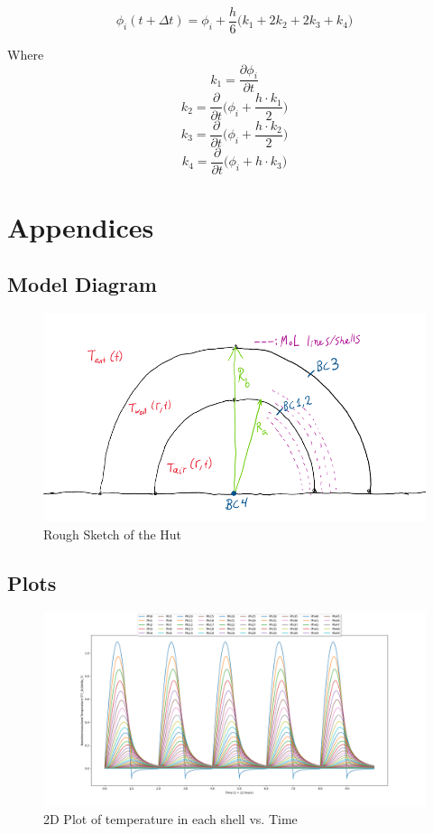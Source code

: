 \documentclass{article}
\begin{document}
\[\phi_i(t+\Delta t) = \phi_i + \frac{h}{6} \big(k_1 + 2k_2 + 2k_3 + k_4)\]

Where
\[k_1 = \frac{\partial \phi_i}{\partial t}\]
\[k_2 = \frac{\partial}{\partial t} \bigg(\phi_i + \frac{h \cdot k_1}{2}\bigg)\]
\[k_3 = \frac{\partial}{\partial t} \bigg(\phi_i + \frac{h \cdot k_2}{2}\bigg)\]
\[k_4 = \frac{\partial}{\partial t} \bigg(\phi_i + h \cdot k_3\bigg)\]

\pagebreak

\section{Appendices}

\subsection{Model Diagram}

\begin{figure}[h]
    \centering
    \includegraphics[width=0.5\linewidth]{Model Diagram.PNG}
    \caption{Rough Sketch of the Hut}
    \label{Model Sketch}
\end{figure}

\subsection{Plots}

\begin{figure}[h]
    \centering
    \includegraphics[width=0.8\linewidth]{2D Plot.png}
    \caption{2D Plot of temperature in each shell vs. Time}
    \label{2d plot}
\end{figure}
\end{document}
